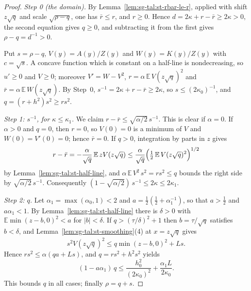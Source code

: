 \begin{proof}
  \leanok
\emph{Step 0 (the domain).} By Lemma~\ref{lem:sg-tal:st-rbar-le-r}, applied with shift $z\sqrt q$ and scale
$\sqrt{\rho-q}$, one has $\bar r\le r$, and $r\ge0$. Hence $d=2\kappa+r-\bar r\ge2\kappa>0$, the second equation
gives $q\ge0$, and subtracting it from the first gives $\rho-q=d^{-1}>0$.

Put $s=\rho-q$, $V(y)=A(y)/Z(y)$ and $W(y)=K(y)/Z(y)$ with $c=\sqrt s$. A concave function which is constant on
a half-line is nondecreasing, so $u'\ge0$ and $V\ge0$; moreover $V'=W-V^2$,
$r=\alpha\,\mathbb E\,V(z\sqrt q)^2$ and $\bar r=\alpha\,\mathbb E\,W(z\sqrt q)$. By Step~0,
$s^{-1}=2\kappa+r-\bar r\ge2\kappa$, so $s\le(2\kappa_0)^{-1}$, and $q=(r+h^2)s^2\ge rs^2$.

\emph{Step 1: $s^{-1}$, for $\kappa\le\kappa_1$.} We claim $r-\bar r\le\sqrt{\alpha/2}\,s^{-1}$. This is clear if $\alpha=0$. If
$\alpha>0$ and $q=0$, then $r=0$, so $V(0)=0$ is a minimum of $V$ and $W(0)=V'(0)=0$; hence $\bar r=0$. If
$q>0$, integration by parts in $z$ gives
\[
r-\bar r=-\frac{\alpha}{\sqrt q}\,\mathbb E\,zV(z\sqrt q)
\le\frac{\alpha}{\sqrt q}\Bigl(\tfrac12\,\mathbb E\,V(z\sqrt q)^2\Bigr)^{1/2}
\]
by Lemma~\ref{lem:sg-tal:st-half-line}, and $\alpha\,\mathbb E\,V^2\,s^2=rs^2\le q$ bounds the right side by
$\sqrt{\alpha/2}\,s^{-1}$. Consequently $(1-\sqrt{\alpha/2})\,s^{-1}\le2\kappa\le2\kappa_1$.

\emph{Step 2: $q$.} Let $\alpha_1=\max(\alpha_0,1)<2$ and $a=\tfrac12(\tfrac12+\alpha_1^{-1})$, so that
$a>\tfrac12$ and $a\alpha_1<1$. By Lemma~\ref{lem:sg-tal:st-half-line} there is $\delta>0$ with
$\mathbb E\min(z-b,0)^2<a$ for $|b|<\delta$. If $q>(\tau/\delta)^2+1$ then $b=\tau/\sqrt q$ satisfies
$b<\delta$, and Lemma~\ref{lem:sg-tal:st-smoothing}(4) at $x=z\sqrt q$ gives
\[
s^2V(z\sqrt q)^2\le q\min(z-b,0)^2+Ls .
\]
Hence $rs^2\le\alpha(qa+Ls)$, and $q=rs^2+h^2s^2$ yields
\[
(1-a\alpha_1)\,q\le\frac{h_0^2}{(2\kappa_0)^2}+\frac{\alpha_1L}{2\kappa_0}.
\]
This bounds $q$ in all cases; finally $\rho=q+s$.
\end{proof}

